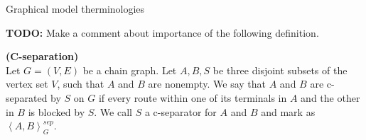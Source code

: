 Graphical model therminologies



\textbf{TODO:} Make a comment about importance of the following definition.

\begin{defi} {\textbf{(C-separation)}} \\
	Let $G = (V, E)$ be a chain graph. Let $A, B, S$ be three disjoint subsets of the vertex set $V$, such that
	$A$ and $B$ are nonempty. We say that $A$ and $B$ are c-separated by $S$ on $G$ if every route within one of 
	its terminals in $A$ and the other in $B$ is blocked by $S$. 
	We call $S$ a c-separator for $A$ and $B$ and mark as
	$ \left\langle A, B \right\rangle_{G}^{sep}$.
	
\end{defi}

